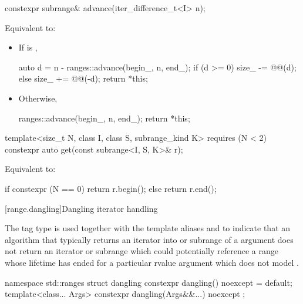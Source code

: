 %
\begin{itemdecl}
constexpr subrange& advance(iter_difference_t<I> n);
\end{itemdecl}

\begin{itemdescr}
\pnum
\effects Equivalent to:
\begin{itemize}
\item If  is ,
\begin{codeblock}
auto d = n - ranges::advance(begin_, n, end_);
if (d >= 0)
  size_ -= @@(d);
else
  size_ += @@(-d);
return *this;
\end{codeblock}
\item Otherwise,
\begin{codeblock}
ranges::advance(begin_, n, end_);
return *this;
\end{codeblock}
\end{itemize}
\end{itemdescr}

%
\begin{itemdecl}
template<size_t N, class I, class S, subrange_kind K>
  requires (N < 2)
constexpr auto get(const subrange<I, S, K>& r);
\end{itemdecl}

\begin{itemdescr}
\pnum
\effects Equivalent to:
\begin{codeblock}
if constexpr (N == 0)
  return r.begin();
else
  return r.end();
\end{codeblock}
\end{itemdescr}

[range.dangling]{Dangling iterator handling}

\pnum
The tag type  is used together
with the template aliases  and 
to indicate that an algorithm
that typically returns an iterator into or subrange of a  argument
does not return an iterator or subrange
which could potentially reference a range
whose lifetime has ended for a particular rvalue  argument
which does not model .
\begin{codeblock}
namespace std::ranges {
  struct dangling {
    constexpr dangling() noexcept = default;
    template<class... Args>
      constexpr dangling(Args&&...) noexcept { }
  };
}
\end{codeblock}

